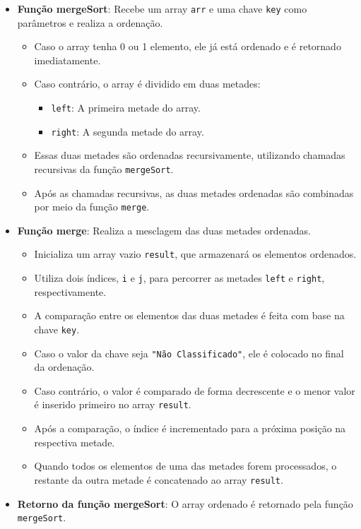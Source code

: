 \begin{itemize}
\item \textbf{Função mergeSort}: Recebe um array \texttt{arr} e uma chave \texttt{key} como parâmetros e realiza a ordenação.
\begin{itemize}
\item Caso o array tenha 0 ou 1 elemento, ele já está ordenado e é retornado imediatamente.
\item Caso contrário, o array é dividido em duas metades:
\begin{itemize}
\item \texttt{left}: A primeira metade do array.
\item \texttt{right}: A segunda metade do array.
\end{itemize}
 \item Essas duas metades são ordenadas recursivamente, utilizando chamadas recursivas da função \texttt{mergeSort}.
\item Após as chamadas recursivas, as duas metades ordenadas são combinadas por meio da função \texttt{merge}.
\end{itemize}
    
\item \textbf{Função merge}: Realiza a mesclagem das duas metades ordenadas.
\begin{itemize}
\item Inicializa um array vazio \texttt{result}, que armazenará os elementos ordenados.
\item Utiliza dois índices, \texttt{i} e \texttt{j}, para percorrer as metades \texttt{left} e \texttt{right}, respectivamente.
\item A comparação entre os elementos das duas metades é feita com base na chave \texttt{key}.
\item Caso o valor da chave seja \texttt{"Não Classificado"}, ele é colocado no final da ordenação.
\item Caso contrário, o valor é comparado de forma decrescente e o menor valor é inserido primeiro no array \texttt{result}.
\item Após a comparação, o índice é incrementado para a próxima posição na respectiva metade.
\item Quando todos os elementos de uma das metades forem processados, o restante da outra metade é concatenado ao array \texttt{result}.
\end{itemize}
    
\item \textbf{Retorno da função mergeSort}: O array ordenado é retornado pela função \texttt{mergeSort}.
\end{itemize}

